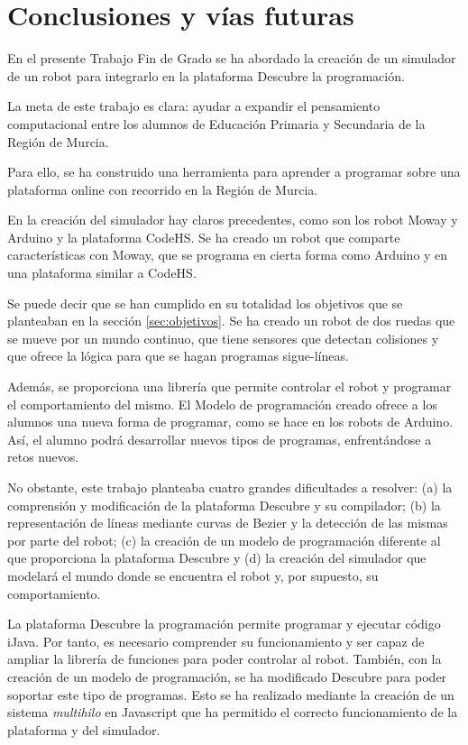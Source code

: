 \chapter{Conclusiones y vías futuras}
\label{conslusiones}


En el presente Trabajo Fin de Grado se ha abordado la creación de un simulador de un robot para integrarlo en la plataforma Descubre la programación. 

La meta de este trabajo es clara: ayudar a expandir el pensamiento computacional entre los alumnos de Educación Primaria y Secundaria de la Región de Murcia.

Para ello, se ha construido una herramienta para aprender a programar sobre una plataforma online con recorrido en la Región de Murcia. 

En la creación del simulador hay claros precedentes, como son los robot Moway y Arduino y la plataforma CodeHS. Se ha creado un robot que comparte características con Moway, que se programa en cierta forma como Arduino y en una plataforma similar a CodeHS. 

Se puede decir que se han cumplido en su totalidad los objetivos que se planteaban en la sección \ref{sec:objetivos}. Se ha creado un robot de dos ruedas que se mueve por un mundo continuo, que tiene sensores que detectan colisiones y que ofrece la lógica para que se hagan programas sigue-líneas. 

Además, se proporciona una librería que permite controlar el robot y programar el comportamiento del mismo. El Modelo de programación creado ofrece a los alumnos una nueva forma de programar, como se hace en los robots de Arduino. Así, el alumno podrá desarrollar nuevos tipos de programas, enfrentándose a retos nuevos. 

No obstante, este trabajo planteaba cuatro grandes dificultades a resolver: (a) la comprensión y modificación de la plataforma Descubre y su compilador; (b) la representación de líneas mediante curvas de Bezier y la detección de las mismas por parte del robot; (c) la creación de un modelo de programación diferente al que proporciona la plataforma Descubre y (d) la creación del simulador que modelará el mundo donde se encuentra el robot y, por supuesto, su comportamiento.

La plataforma Descubre la programación permite programar y ejecutar código iJava. Por tanto, es necesario comprender su funcionamiento y ser capaz de ampliar la librería de funciones para poder controlar al robot. También, con la creación de un modelo de programación, se ha modificado Descubre para poder soportar este tipo de programas. Esto se ha realizado mediante la creación de un sistema \emph{multihilo} en Javascript que ha permitido el correcto funcionamiento de la plataforma y del simulador. 

